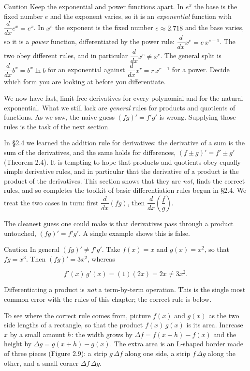 \documentclass[a4paper,12pt,oneside]{memoir}
\begin{document}
\begin{envcaution}{Caution}{}{}
Keep the exponential and power functions apart. In \(e^{x}\) the base is the fixed number \(e\) and the exponent varies, so it is an \emph{exponential} function with \(\dfrac{d}{dx}e^{x} = e^{x}\). In \(x^{e}\) the exponent is the fixed number \(e \approx 2.718\) and the base varies, so it is a \emph{power} function, differentiated by the power rule: \(\dfrac{d}{dx}x^{e} = e\,x^{e-1}\). The two obey different rules, and in particular \(\dfrac{d}{dx}x^{e} \ne x^{e}\). The general split is \(\dfrac{d}{dx}b^{x} = b^{x}\ln b\) for an exponential against \(\dfrac{d}{dx}x^{r} = r\,x^{r-1}\) for a power. Decide which form you are looking at before you differentiate.
\end{envcaution}
We now have fast, limit-free derivatives for every polynomial and for the natural exponential. What we still lack are \emph{general} rules for products and quotients of functions. As we saw, the naive guess \((fg)' = f'g'\) is wrong. Supplying those rules is the task of the next section.


In §2.4 we learned the addition rule for derivatives: the derivative of a sum is the sum of the derivatives, and the same holds for differences, \((f \pm g)' = f' \pm g'\) (Theorem 2.4). It is tempting to hope that products and quotients obey equally simple derivative rules, and in particular that the derivative of a product is the product of the derivatives. This section shows that they are \emph{not}, finds the correct rules, and so completes the toolkit of basic differentiation rules begun in §2.4. We treat the two cases in turn: first \(\dfrac{d}{dx}(fg)\), then \(\dfrac{d}{dx}\!\left(\dfrac{f}{g}\right)\).

The cleanest guess one could make is that derivatives pass through a product untouched, \((fg)' = f'g'\). A single example shows this is false.

\begin{envcaution}{Caution}{}{}
In general \((fg)' \ne f'g'\). Take \(f(x) = x\) and \(g(x) = x^{2}\), so that \(fg = x^{3}\). Then \((fg)' = 3x^{2}\), whereas

\[ f'(x)\,g'(x) = (1)(2x) = 2x \ne 3x^{2}. \]

Differentiating a product is \emph{not} a term-by-term operation. This is the single most common error with the rules of this chapter; the correct rule is below.
\end{envcaution}
To see where the correct rule comes from, picture \(f(x)\) and \(g(x)\) as the two side lengths of a rectangle, so that the product \(f(x)\,g(x)\) is its area. Increase \(x\) by a small amount \(h\): the width grows by \(\Delta f = f(x+h) - f(x)\) and the height by \(\Delta g = g(x+h) - g(x)\). The extra area is an L-shaped border made of three pieces (Figure 2.9): a strip \(g\,\Delta f\) along one side, a strip \(f\,\Delta g\) along the other, and a small corner \(\Delta f\,\Delta g\).
\end{document}
